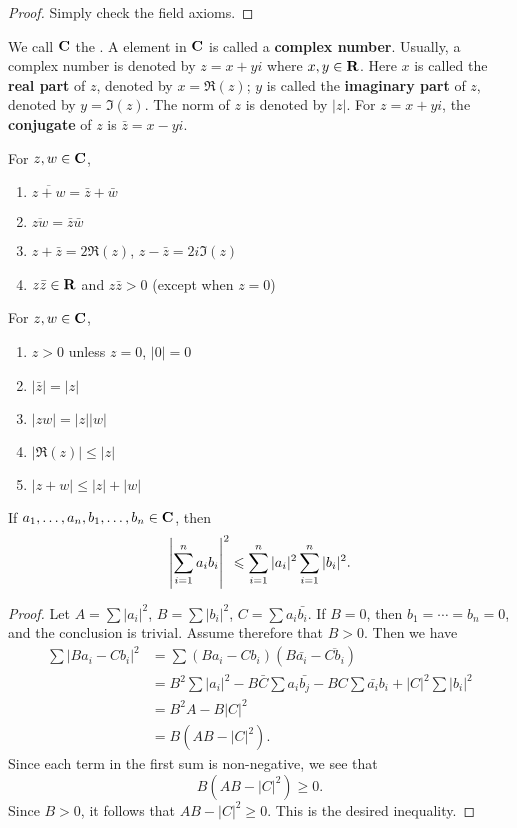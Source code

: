 \begin{proof}
Simply check the field axioms.
\end{proof}

We call $\mathbf C$ the . A element in $\mathbf C$ is called a \textbf{complex number}. Usually, a complex number is denoted by $z=x+yi$ where $x,y\in\mathbf R$. Here $x$ is called the \textbf{real part} of $z$, denoted by $x=\Re(z)$; $y$ is called the \textbf{imaginary part} of $z$, denoted by $y=\Im(z)$. The norm of $z$ is denoted by $|z|$. For $z=x+yi$, the \textbf{conjugate} of $z$ is $\bar{z}=x-yi$.

\begin{proposition}
For $z,w\in\mathbf C$,
\begin{enumerate}[label=(\roman*)]
\item $\overline{z+w}=\bar{z}+\bar{w}$
\item $\overline{zw}=\bar{z}\bar{w}$
\item $z+\bar{z}=2\Re(z)$, $z-\bar{z}=2i\Im(z)$
\item $z\bar{z}\in\mathbf R$ and $z\bar{z}>0$ (except when $z=0$)
\end{enumerate}
\end{proposition}

\begin{proposition}
For $z,w\in\mathbf C$,
\begin{enumerate}[label=(\roman*)]
\item $z>0$ unless $z=0$, $|0|=0$
\item $|\bar{z}|=|z|$
\item $|zw|=|z||w|$
\item $|\Re(z)|\le|z|$
\item $|z+w|\le|z|+|w|$
\end{enumerate}
\end{proposition}

\begin{theorem}
If $a_1,\dots,a_n,b_1,\dots,b_n\in\mathbf C$, then
\begin{equation}
\left|\sum_{i=1}^{n}a_ib_i\right|^2\leqslant\sum_{i=1}^{n}|a_i|^2\sum_{i=1}^{n}|b_i|^2.
\end{equation}
\end{theorem}

\begin{proof}
Let $A=\sum|a_i|^2$, $B=\sum|b_i|^2$, $C=\sum a_i\bar{b_i}$. If $B=0$, then $b_1=\cdots=b_n=0$, and the conclusion is trivial. Assume therefore that $B>0$. Then we have
\begin{align*}
\sum|Ba_i-Cb_i|^2
&=\sum(Ba_i-Cb_i)(B\bar{a_i}-\overline{Cb_i})\\
&=B^2\sum|a_i|^2-B\bar{C}\sum a_i\bar{b_j}-BC\sum\bar{a_i}b_i+|C|^2\sum|b_i|^2\\
&=B^2A-B|C|^2\\
&=B(AB-|C|^2).
\end{align*}
Since each term in the first sum is non-negative, we see that
\[B(AB-|C|^2)\ge0.\]
Since $B>0$, it follows that $AB-|C|^2\ge0$. This is the desired inequality.
\end{proof}

